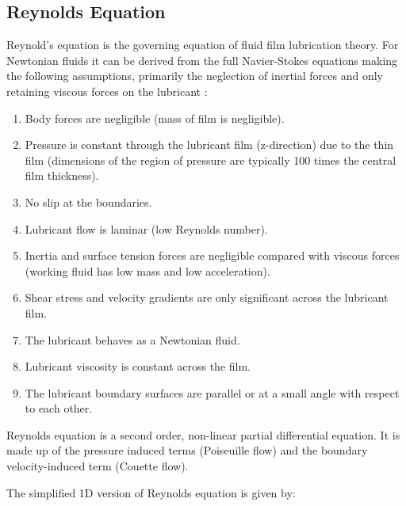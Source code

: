 \subsection{Reynolds Equation}

Reynold’s equation \cite{Reynolds1886} is the governing equation of fluid film lubrication theory. For Newtonian fluids it can be derived from the full Navier-Stokes equations making the following assumptions, primarily the neglection of inertial forces and only retaining viscous forces on the lubricant \cite{Gohar1988}:
\begin{enumerate} %
	\item Body forces are negligible (mass of film is negligible).
	\item Pressure is constant through the lubricant film (z-direction) due to the thin film (dimensions of the region of pressure are typically 100 times the central film thickness).
	\item No slip at the boundaries.
	\item Lubricant flow is laminar (low Reynolds number).
	\item Inertia and surface tension forces are negligible compared with viscous forces (working fluid has low mass and low acceleration).
	\item Shear stress and velocity gradients are only significant across the lubricant film.
	\item The lubricant behaves as a Newtonian fluid.
	\item Lubricant viscosity is constant across the film.
	\item The lubricant boundary surfaces are parallel or at a small angle with respect to each other.
\end{enumerate}

Reynolds equation is a second order, non-linear partial differential equation. It is made up of the pressure induced terms (Poiseuille flow) and the boundary velocity-induced term (Couette flow). 

The simplified 1D version of Reynolds equation is given by:


